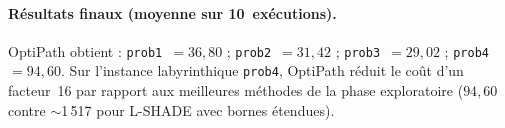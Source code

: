 \paragraph{Résultats finaux (moyenne sur 10~exécutions).}
OptiPath obtient : \texttt{prob1}~$= 36{,}80$ ; \texttt{prob2}~$= 31{,}42$ ;
\texttt{prob3}~$= 29{,}02$ ; \texttt{prob4}~$= 94{,}60$.  Sur l'instance
labyrinthique \texttt{prob4}, OptiPath réduit le coût d'un facteur~16 par
rapport aux meilleures méthodes de la phase exploratoire ($94{,}60$ contre
$\sim$1\,517 pour L-SHADE avec bornes étendues).
